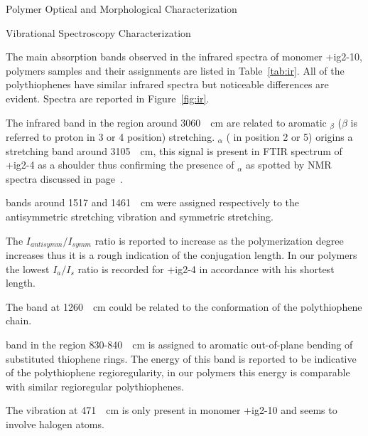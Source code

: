 \begin{section}{Polymer Optical and Morphological Characterization}
\begin{subsection}{Vibrational Spectroscopy Characterization}
\label{sec:ir}

The main absorption bands observed in the infrared spectra of monomer \cmpd+{ig2-10}, polymers samples and their assignments are listed in Table~\ref{tab:ir}. All of the poly\-thio\-phenes have similar infrared spectra but noticeable differences are evident. Spectra are reported in Figure~\ref{fig:ir}.

The infrared band in the region around \SI{3060}{\per\cm} are related to aromatic $_\beta$ ($\beta$ 
is referred to proton in 3 or 4 position) stretching. $_\alpha$ ( in position 2 or 5) 
origins a stretching band around \SI{3105}{\per\cm}, this signal is present in \gls{FTIR} spectrum of \cmpd+{ig2-4} as a shoulder thus confirming the presence of $_\alpha$ as spotted by \gls{NMR} spectra discussed in page~\pageref{h-terminale}.

 bands around 1517 and \SI{1461}{\per\cm} were assigned respectively to the  antisymmetric stretching vibration and  symmetric stretching. 

\noindent
The $I_{antisymm}/I_{symm}$ ratio is reported to increase as the polymerization degree increases thus it is a rough indication of the conjugation length. In our polymers the lowest $I_{a}/I_{s}$ ratio is recorded for \cmpd+{ig2-4} in accordance with his shortest length. 

The  band at \SI{1260}{\per\cm} could be related to the conformation of the poly\-thio\-phene chain.

 band in the region 830-\SI{840}{\per\cm} is assigned to aromatic  out-of-plane bending of substituted thio\-phene rings. The energy of this band is reported to be indicative of the poly\-thio\-phene regioregularity, in our polymers this energy is comparable with similar regioregular poly\-thio\-phenes.

The vibration at \SI{471}{\per\cm} is only present in monomer \cmpd+{ig2-10} and seems to involve halogen atoms.


\end{subsection}
\end{section}
